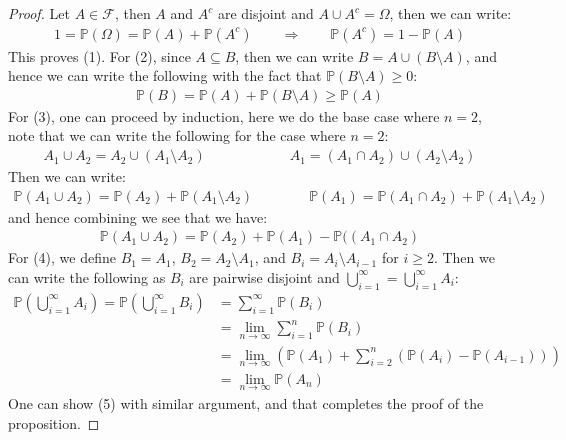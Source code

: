 \documentclass[11pt]{book}
\theoremstyle{break}
\theoremstyle{break}
\begin{document}
\begin{proof}
Let $A\in\mathcal{F}$, then $A$ and $A^c$ are disjoint and $A\cup A^c = \Omega$, then we can write:
\begin{align*}
1 = \mathbb{P}(\Omega) = \mathbb{P}(A) + \mathbb{P}(A^c)\qquad \Rightarrow \qquad \mathbb{P}(A^c) = 1 - \mathbb{P}(A)
\end{align*}
This proves (1). For (2), since $A\subseteq B$, then we can write $B = A\cup (B\setminus A)$, and hence we can write the following with the fact that $\mathbb{P}(B\setminus A) \geq 0$:
\begin{align*}
\mathbb{P}(B) = \mathbb{P}(A) + \mathbb{P}(B\setminus A) \geq \mathbb{P}(A)
\end{align*}
For (3), one can proceed by induction, here we do the base case where $n=2$, note that we can write the following for the case where $n=2$:
\begin{align*}
A_1 \cup A_2 = A_2 \cup (A_1 \setminus A_2) \qquad\qquad\qquad A_1 = (A_1 \cap A_2) \cup (A_2 \setminus A_2)
\end{align*}
Then we can write:
\begin{align*}
\mathbb{P}(A_1\cup A_2) = \mathbb{P}(A_2) + \mathbb{P}(A_1\setminus A_2) \qquad\qquad \mathbb{P}(A_1) = \mathbb{P}(A_1 \cap A_2) + \mathbb{P}(A_1\setminus A_2)
\end{align*}
and hence combining we see that we have:
\begin{align*}
\mathbb{P}(A_1 \cup A_2) = \mathbb{P}(A_2) + \mathbb{P}(A_1) - \mathbb{P}((A_1 \cap A_2)
\end{align*}
For (4), we define $B_1 = A_1$, $B_2 = A_2 \setminus A_1$, and $B_i = A_i \setminus A_{i-1}$ for $i \geq 2$. Then we can write the following as $B_i$  are pairwise disjoint and $\bigcup_{i=1}^\infty  = \bigcup_{i=1}^\infty A_i$:
\begin{align*}
\mathbb{P}\left(\bigcup_{i=1}^\infty A_i\right) = \mathbb{P}\left( \bigcup_{i=1}^\infty B_i\right) &= \sum_{i=1}^\infty \mathbb{P}(B_i)\\ 
&= \lim_{n\to \infty}\sum_{i=1}^n \mathbb{P}(B_i) \\
&= \lim_{n\to \infty}\left( \mathbb{P}(A_1) + \sum_{i=2}^n \left( \mathbb{P}(A_i) - \mathbb{P}(A_{i-1}) \right) \right)\\
&= \lim_{n\to \infty}\mathbb{P}(A_n)
\end{align*}
One can show (5) with similar argument, and that completes the proof of the proposition.
\end{proof}
\end{document}
